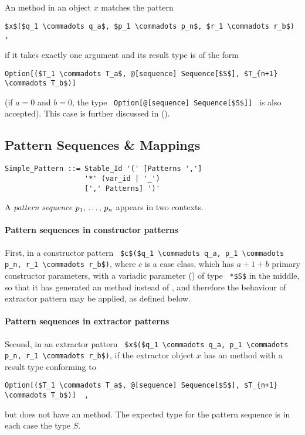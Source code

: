 An  method in an object $x$ matches the pattern 
\begin{lstlisting}
$x$($q_1 \commadots q_a$, $p_1 \commadots p_n$, $r_1 \commadots r_b$)  ,
\end{lstlisting}
if it takes exactly one argument and its result type is of the form 
\begin{lstlisting}
Option[($T_1 \commadots T_a$, @[sequence] Sequence[$S$], $T_{n+1} \commadots T_b$)]
\end{lstlisting}
(if $a = 0$ and $b = 0$, the type ~\lstinline!Option[@[sequence] Sequence[$S$]]!~ is also accepted). This case is further discussed in ().





\subsection{Pattern Sequences \& Mappings}
\label{sec:pattern-sequences}

\syntax\begin{lstlisting}
Simple_Pattern ::= Stable_Id '(' [Patterns ','] 
                   '*' (var_id | '_')
                   [',' Patterns] ')'
\end{lstlisting}

A {\em pattern sequence} $p_1 ,\, \ldots ,\, p_n$ appears in two contexts. 

\paragraph{Pattern sequences in constructor patterns}
First, in a constructor pattern ~\lstinline!$c$($q_1 \commadots q_a, p_1 \commadots p_n, r_1 \commadots r_b$)!, where $c$ is a case class, which has $a+1+b$ primary constructor parameters, with a variadic parameter () of type ~\lstinline!*$S$! in the middle, so that it has generated an  method instead of , and therefore the behaviour of extractor pattern may be applied, as defined below. 

\paragraph{Pattern sequences in extractor patterns}
Second, in an extractor pattern ~\lstinline!$x$($q_1 \commadots q_a, p_1 \commadots p_n, r_1 \commadots r_b$)!, if the extractor object $x$ has an  method with a result type conforming to
\begin{lstlisting}
Option[($T_1 \commadots T_a$, @[sequence] Sequence[$S$], $T_{n+1} \commadots T_b$)]  ,
\end{lstlisting}
but does not have an  method. The expected type for the pattern sequence is in each case the type $S$. 

